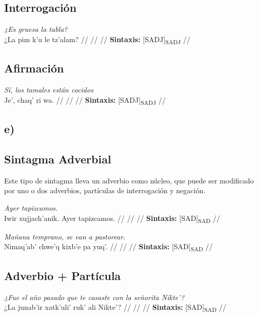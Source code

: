 \documentclass{article}%
\begin{document}
\subsection{Interrogación}%
\label{subsec:Interrogacin}%

%
\par\medskip%
\ex
\textit{¿Es gruesa la tabla?} \\
\begingl
\gla ¿La pim k'u le tz'alam? //
\glb  //
\glc  //
\glft \textbf{Sintaxis:} [SADJ]\textsubscript{SADJ} //
\endgl
\xe
%
\medskip%
\subsection{Afirmación}%
\label{subsec:Afirmacin}%

%
\par\medskip%
\ex
\textit{Sí, los tamales están cocidos} \\
\begingl
\gla Je', chaq' ri wa. //
\glb  //
\glc  //
\glft \textbf{Sintaxis:} [SADJ]\textsubscript{SADJ} //
\endgl
\xe
%
\medskip%
\subsection{e)}%
\label{subsec:e)}%

%
\subsection{Sintagma Adverbial}%
\label{subsec:SintagmaAdverbial}%

%
Este tipo de sintagma lleva un adverbio como núcleo, que puede ser modificado por uno %
o dos adverbios, partículas de interrogación y negación. %
\par\medskip%
\ex
\textit{Ayer tapizcamos.} \\
\begingl
\gla Iwir xujjach'anik. Ayer tapizcamos. //
\glb  //
\glc  //
\glft \textbf{Sintaxis:} [SAD]\textsubscript{SAD} //
\endgl
\xe
%
\medskip%
\par\medskip%
\ex
\textit{Mañana temprano, se van a pastorear.} \\
\begingl
\gla Nimaq'ab' chwe'q kixb'e pa yuq'. //
\glb  //
\glc  //
\glft \textbf{Sintaxis:} [SAD]\textsubscript{SAD} //
\endgl
\xe
%
\medskip%
\subsection{Adverbio + Partícula}%
\label{subsec:Adverbio+Partcula}%

%
\par\medskip%
\ex
\textit{¿Fue el año pasado que te casaste con la señorita Nikte'?} \\
\begingl
\gla ¿La junab'ir xatk'uli' ruk' ali Nikte'? //
\glb  //
\glc  //
\glft \textbf{Sintaxis:} [SAD]\textsubscript{SAD} //
\endgl
\xe
%

%
\end{document}
